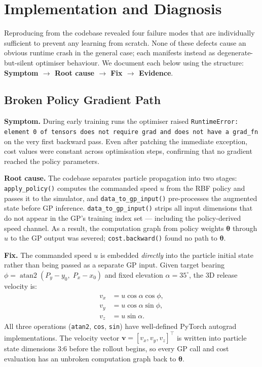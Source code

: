 \section{Implementation and Diagnosis}
\label{sec:implementation}

Reproducing \mcpilot{} \cite{turcato2025mcpilot} from the \mcpilco{}
codebase \cite{mcpilco} revealed four failure modes that are individually
sufficient to prevent any learning from scratch.
None of these defects cause an obvious runtime crash in the general case; each
manifests instead as degenerate-but-silent optimiser behaviour.
We document each below using the structure: \textbf{Symptom $\to$ Root cause $\to$
Fix $\to$ Evidence}.

\subsection{Broken Policy Gradient Path}
\label{sec:fix_gradient}

\textbf{Symptom.}
During early training runs the optimiser raised
\texttt{RuntimeError: element 0 of tensors does not require grad and does not have a
grad\_fn} on the very first backward pass.
Even after patching the immediate exception, cost values were constant across
optimisation steps, confirming that no gradient reached the policy parameters.

\textbf{Root cause.}
The \mcpilco{} codebase separates particle propagation into two stages:
\texttt{apply\_policy()} computes the commanded speed $u$ from the RBF policy and
passes it to the simulator, and \texttt{data\_to\_gp\_input()} pre-processes the
augmented state before GP inference.
\texttt{data\_to\_gp\_input()} strips all input dimensions that do not appear in the
GP's training index set — including the policy-derived speed channel.
As a result, the computation graph from policy weights $\boldsymbol{\theta}$ through
$u$ to the GP output was severed; \texttt{cost.backward()} found no path to
$\boldsymbol{\theta}$.

\textbf{Fix.}
The commanded speed $u$ is embedded \emph{directly} into the particle initial state
rather than being passed as a separate GP input.
Given target bearing $\phi = \operatorname{atan2}(P_y - y_0,\; P_x - x_0)$ and fixed
elevation $\alpha = 35^\circ$, the 3D release velocity is:
\begin{align}
  v_x &= u\cos\alpha\cos\phi, \label{eq:vx} \\
  v_y &= u\cos\alpha\sin\phi, \label{eq:vy} \\
  v_z &= u\sin\alpha.         \label{eq:vz}
\end{align}
All three operations (\texttt{atan2}, \texttt{cos}, \texttt{sin}) have well-defined
PyTorch autograd implementations.
The velocity vector $\mathbf{v} = [v_x, v_y, v_z]^\top$ is written into particle
state dimensions 3:6 before the rollout begins, so every GP call and cost evaluation
has an unbroken computation graph back to $\boldsymbol{\theta}$.

